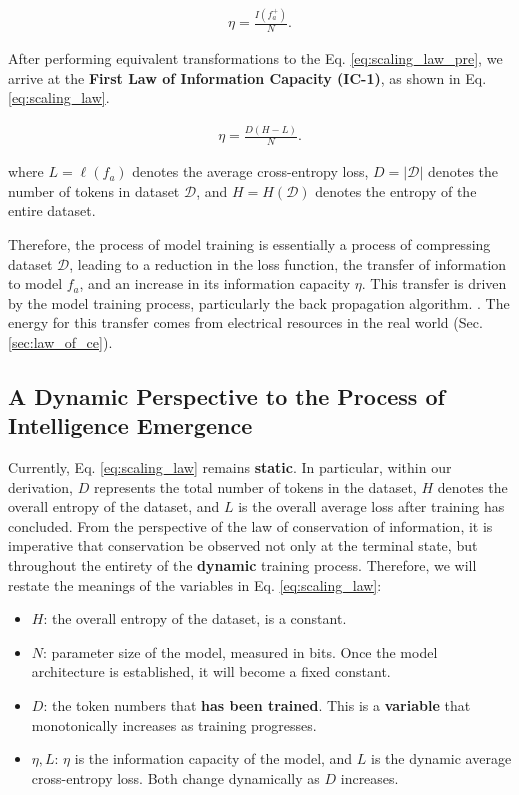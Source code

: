 \documentclass{article}
\theoremstyle{plain}
\theoremstyle{definition}
\theoremstyle{remark}
\begin{document}
\begin{equation}
\label{eq:scaling_law_pre}
\begin{aligned}
    \eta = \frac{I(f_a^{+})}{N}.
\end{aligned}
\end{equation}

After performing equivalent transformations to the Eq. \ref{eq:scaling_law_pre}, we arrive at the \textbf{First Law of Information Capacity (IC-1)}, as shown in Eq. \ref{eq:scaling_law}.

\begin{equation}
\label{eq:scaling_law}
\begin{aligned}
    \eta = \frac{D(H-L)}{N}.
\end{aligned}
\end{equation}

where $L=\ell(f_a)$ denotes the average cross-entropy loss, $D=|\mathcal{D}|$ denotes the number of tokens in dataset $\mathcal{D}$, and $H=H(\mathcal{D})$ denotes the entropy of the entire dataset.

Therefore, the process of model training is essentially a process of compressing dataset $\mathcal{D}$, leading to a reduction in the loss function, the transfer of information to model $f_a$, and an increase in its information capacity $\eta$. This transfer is driven by the model training process, particularly the back propagation algorithm. \cite{BP_1986}. The energy for this transfer comes from electrical resources in the real world (Sec. \ref{sec:law_of_ce}).

\subsection{A Dynamic Perspective to the Process of Intelligence Emergence}\label{subsec:dynamic_intelligence_emergence}

Currently, Eq. \ref{eq:scaling_law} remains \textbf{static}. In particular, within our derivation, $D$ represents the total number of tokens in the dataset, $H$ denotes the overall entropy of the dataset, and $L$ is the overall average loss after training has concluded. From the perspective of the law of conservation of information, it is imperative that conservation be observed not only at the terminal state, but throughout the entirety of the \textbf{dynamic} training process. Therefore, we will restate the meanings of the variables in Eq. \ref{eq:scaling_law}:

\begin{itemize}
    \item $H$: the overall entropy of the dataset, is a constant.
    \item $N$: parameter size of the model, measured in bits. Once the model architecture is established, it will become a fixed constant.
    \item $D$: the token numbers that \textbf{has been trained}. This is a \textbf{variable} that monotonically increases as training progresses.
    \item $\eta,L$: $\eta$ is the information capacity of the model, and $L$ is the dynamic average cross-entropy loss. Both change dynamically as $D$ increases.
\end{itemize}
\end{document}
